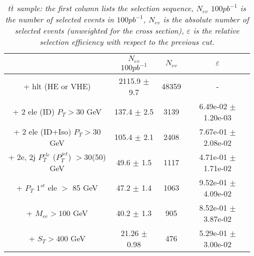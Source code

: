 \documentclass[colclass=cmspaper]{combine}
\begin{document}
\begin{linenumbers}


\begin{table}[htbp]
\begin{center}
\begin{tabular}{|c|c|c|c|}
\hline
\hline
 & $N_{ev}$ $100pb^{-1}$ & $N_{ev}$ & $\varepsilon$ \\
\hline
\hline

+ hlt (HE or VHE) &2115.9 $\pm$ 9.7 & 48359 & - \\
+ 2 ele (ID) $P_{T} >30$ GeV &137.4 $\pm$ 2.5& 3139 & 6.49e-02 $\pm$ 1.20e-03\\
+ 2 ele (ID+Iso) $P_{T} >30$ GeV &105.4 $\pm$ 2.1 & 2408 & 7.67e-01 $\pm$ 2.08e-02\\
+ 2e, 2j $P_{T}^{ele}$ ($P_{T}^{jet}$) $>$30(50) GeV &49.6 $\pm$ 1.5& 1117 & 4.71e-01 $\pm$ 1.71e-02\\
+ $P_{T}$ $1^{st}$ ele $>$ 85 GeV &47.2 $\pm$ 1.4& 1063 & 9.52e-01 $\pm$ 4.09e-02\\
+ $M_{ee} >100$ GeV&40.2 $\pm$ 1.3& 905 & 8.52e-01 $\pm$ 3.87e-02\\
+ $S_{T} >400$ GeV &21.26 $\pm$ 0.98 & 476 & 5.29e-01 $\pm$ 3.00e-02\\
\hline
\end{tabular}
\end{center}
\caption{\small \sl $t\bar{t}$ sample: the first column lists the selection sequence, $N_{ev}$ $100pb^{-1}$ is the number of selected events in $100pb^{-1}$, $N_{ev}$ is the absolute number of selected events (unweighted for the cross section), $\varepsilon$ is the relative selection efficiency with respect to the previous cut.}
\label{tab:selection_effic_ttbar}
\end{table}





\end{linenumbers}
\end{document}
